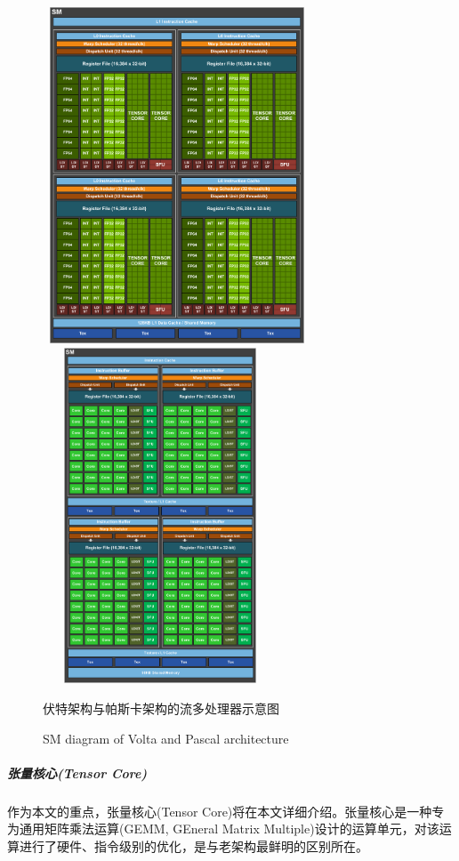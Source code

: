 \begin{figure}
	\centering
	\includegraphics[width=8cm, height=10cm]{figures/VoltaSM.jpg}
	\includegraphics[width=7cm, height=10cm]{figures/PascalSM.jpg}
	\renewcommand{\thefigure}{\arabic{section}-\arabic{figure} }
	\renewcommand{\figurename}{图}
	\caption{伏特架构与帕斯卡架构的流多处理器示意图}
	\addtocounter{figure}{-1}
	\renewcommand{\thefigure}{\arabic{section}-\arabic{figure} }
	\renewcommand{\figurename}{Figure}
	\caption{SM diagram of Volta and Pascal architecture}
	\label{Fig.VoltaPascal}
\end{figure}
\subparagraph{张量核心(Tensor Core)}  
\par 作为本文的重点，张量核心(Tensor Core)将在本文详细介绍。张量核心是一种专为通用矩阵乘法运算(GEMM, GEneral Matrix Multiple)设计的运算单元，对该运算进行了硬件、指令级别的优化，是与老架构最鲜明的区别所在。
